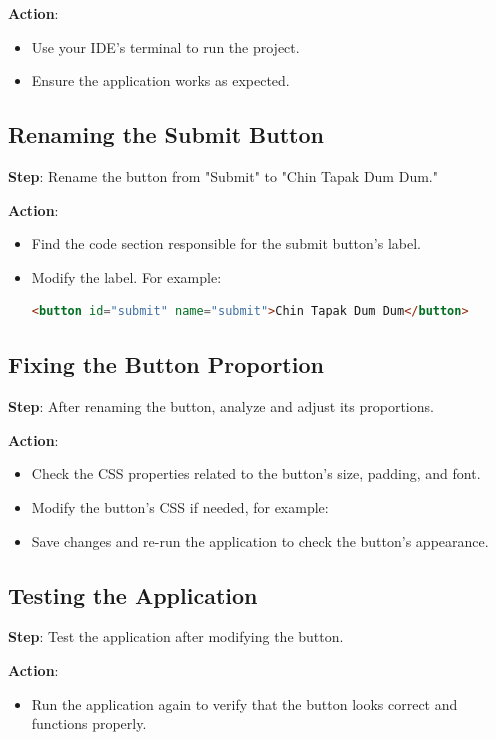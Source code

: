 \documentclass{article}
\begin{document}
\textbf{Action}:
\begin{itemize}
    \item Use your IDE's terminal to run the project.
    \item Ensure the application works as expected.
\end{itemize}

\subsection{Renaming the Submit Button}
\textbf{Step}: Rename the button from "Submit" to "Chin Tapak Dum Dum."

\textbf{Action}:
\begin{itemize}
    \item Find the code section responsible for the submit button's label.
    \item Modify the label. For example:
    \begin{lstlisting}[language=HTML]
    <button id="submit" name="submit">Chin Tapak Dum Dum</button>
    \end{lstlisting}
\end{itemize}

\subsection{Fixing the Button Proportion}
\textbf{Step}: After renaming the button, analyze and adjust its proportions.

\textbf{Action}:
\begin{itemize}
    \item Check the CSS properties related to the button's size, padding, and font.
    \item Modify the button’s CSS if needed, for example:
    \item Save changes and re-run the application to check the button's appearance.
\end{itemize}

\subsection{Testing the Application}
\textbf{Step}: Test the application after modifying the button.

\textbf{Action}: 
\begin{itemize}
    \item Run the application again to verify that the button looks correct and functions properly.
\end{itemize}
\end{document}
